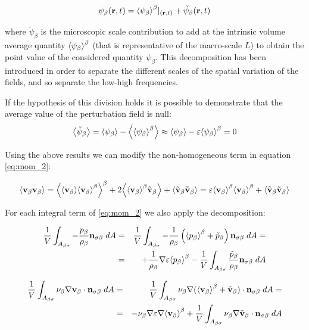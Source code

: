 \begin{equation}
\psi_{\beta}(\mathbf{r},t) = {\left< \psi_{\beta} \right>}^{\beta}|_{(\mathbf{r},t)} + \tilde{\psi}_{\beta}(\mathbf{r},t)
\label{eq:gray}
\end{equation}

where $\tilde{\psi}_{\beta}$ is the microscopic scale contribution to add at the intrinsic volume average quantity $ {\left< \psi_{\beta} \right>}^{\beta}$ (that is representative of the macro-scale $L$) to obtain the point value of the considered quantity $\psi_{\beta}$.
This decomposition has been introduced in order to separate the different scales of the spatial variation of the fields, and so separate the low-high frequencies.

If the hypothesis of this division holds it is possible to demonstrate that the average value of the perturbation field is null:
$$
{\left< \tilde{\psi}_{\beta} \right>} = {\left< \psi_{\beta} \right>} - {\left< {\left< \psi_{\beta} \right>}^{\beta} \right>} \approx {\left< \psi_{\beta} \right>} -\varepsilon {\left< \psi_{\beta} \right>}^{\beta} = 0
$$

Using the above results we can modify the non-homogeneous term in equation \ref{eq:mom_2}:

\begin{equation}
{\left< \textbf{v}_{\beta}\textbf{v}_{\beta}\right>} = {\left< {\left< \textbf{v}_{\beta} \right>}{\left< \textbf{v}_{\beta} \right>}^{\beta} \right>}^{\beta} +2{\left< {\left< \textbf{v}_{\beta} \right>}^{\beta}\tilde{\textbf{v}}_{\beta} \right>} +{\left< \tilde{\textbf{v}}_{\beta} \tilde{\textbf{v}}_{\beta} \right>} = \varepsilon {\left< \textbf{v}_{\beta}\right>}^{\beta}{\left< \textbf{v}_{\beta} \right>}^{\beta} +{\left< \tilde{\textbf{v}}_{\beta}\tilde{\textbf{v}}_{\beta} \right>}
\label{eq:dec_1}
\end{equation}

For each integral term of \ref{eq:mom_2} we also apply the decomposition:

\begin{eqnarray}
\dfrac{1}{V} \int_{A_{\beta \sigma}}  -\dfrac{p_{\beta}}{\rho_{\beta}} \mathbf{n}_{\sigma \beta} \;dA &=& \dfrac{1}{V} \int_{A_{\beta \sigma}}  -\dfrac{1}{\rho_{\beta}} \left({\left< p_{\beta} \right>}^{\beta}  + \tilde{p}_{\beta}\right) \mathbf{n}_{\sigma \beta} \;dA = \nonumber \\
&=& +\dfrac{1}{\rho_{\beta}}\nabla\varepsilon {\left< p_{\beta}\right>}^{\beta} - \dfrac{1}{V} \int_{A_{\beta \sigma}} \dfrac{\tilde{p}_{\beta}}{\rho_{\beta}} \mathbf{n}_{\sigma \beta} \;dA
\end{eqnarray}


\begin{eqnarray}
\dfrac{1}{V} \int_{A_{\beta \sigma}} \nu_{\beta} \nabla \textbf{v}_{\beta} \cdot \mathbf{n}_{\sigma \beta} \;dA &=& \dfrac{1}{V} \int_{A_{\beta \sigma}} \nu_{\beta} \nabla ({\left< \textbf{v}_{\beta} \right>}^{\beta} +\tilde{\textbf{v}}_{\beta}) \cdot \mathbf{n}_{\sigma \beta} \;dA =  \nonumber \\
&=& - \nu_{\beta} \nabla \varepsilon \nabla {\left< \textbf{v}_{\beta}\right>}^{\beta} + \dfrac{1}{V} \int_{A_{\beta \sigma}} \nu_{\beta} \nabla \tilde{\textbf{v}}_{\beta} \cdot \mathbf{n}_{\sigma \beta} \;dA
\end{eqnarray}

